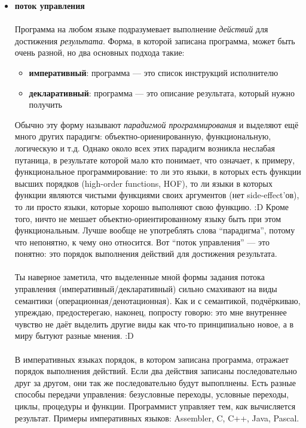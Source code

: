 \documentclass[11pt]{book}
\begin{document}
\begin{itemize}
\item \textbf{поток управления}
    \\ \\
    Программа на любом языке подразумевает выполнение \emph{действий} для достижения \emph{результата}.
    Форма, в которой записана программа, может быть очень разной, но два основных подхода такие:
    \begin{itemize}
    \item \textbf{императивный}: программа --- это список инструкций исполнителю
    \item \textbf{декларативный}: программа --- это описание результата, который нужно получить
    \end{itemize}
    Обычно эту форму называют \emph{парадигмой программирования} и выделяют ещё много других парадигм:
    объектно-ориенированную, функциональную, логическую и т.д.
    Однако около всех этих парадигм возникла неслабая путаница, в результате которой мало кто понимает,
    что означает, к примеру, функциональное программирование: то ли это языки, в которых есть функции высших порядков
    (high-order functions, HOF), то ли языки в которых функции являются чистыми функциями своих аргументов (нет side-effect'ов),
    то ли просто языки, которые хорошо выполняют свою функцию. :D
    Кроме того, ничто не мешает объектно-ориентированному языку быть при этом функциональным.
    Лучше вообще не употреблять слова ``парадигма'', потому что непонятно, к чему оно относится.
    Вот ``поток управления'' --- это понятно: это порядок выполнения действий для достижения результата.
    \\ \\
    Ты наверное заметила, что выделенные мной формы задания потока управления
    (императивный/декларативный) сильно смахивают на виды семантики (операционная/денотационная).
    Как и с семантикой, подчёркиваю, упреждаю, предостерегаю, наконец, попросту говорю:
    это мне внутреннее чувство не даёт выделить другие виды как что-то принципиально новое,
    а в миру бытуют разные мнения. :D
    \\ \\
    В императивных языках порядок, в котором записана программа, отражает порядок выполнения действий.
    Если два действия записаны последовательно друг за другом, они так же последовательно будут выпоплнены.
    Есть разные способы передачи управления: безусловные переходы, условные переходы, циклы, процедуры и функции.
    Программист управляет тем, \emph{как} вычисляется результат.
    Примеры императивных языков: Assembler, C, C++, Java, Pascal.

\end{itemize}
\end{document}
